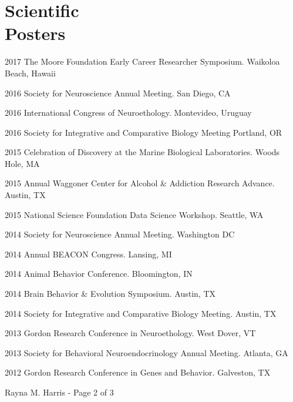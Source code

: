 \documentclass[margin,line]{resume}
\begin{document}
\begin{resume}
\begin{description}
\end{description}


\section{\mysidestyle Scientific\\Posters}

\begin{list1}

\item[]2017	The Moore Foundation Early Career Researcher Symposium. Waikoloa Beach, Hawaii
\item[]2016	Society for Neuroscience Annual Meeting. San Diego, CA
\item[]2016	International Congress of Neuroethology. Montevideo, Uruguay
\item[]2016 Society for Integrative and Comparative Biology Meeting Portland, OR
\item[]2015	Celebration of Discovery at the Marine Biological Laboratories. Woods Hole, MA
\item[]2015	Annual Waggoner Center for Alcohol \& Addiction Research Advance. Austin, TX
\item[]2015	National Science Foundation Data Science Workshop. Seattle, WA
\item[]2014	Society for Neuroscience Annual Meeting. Washington DC
\item[]2014	Annual BEACON Congress. Lansing, MI
\item[]2014	Animal Behavior Conference. Bloomington, IN
\item[]2014	Brain Behavior \& Evolution Symposium. Austin, TX
\item[]2014	Society for Integrative and Comparative Biology Meeting. Austin, TX
\item[]2013	Gordon Research Conference in Neuroethology. West Dover, VT
\item[]2013	Society for Behavioral Neuroendocrinology Annual Meeting. Atlanta, GA
\item[]2012	Gordon Research Conference in Genes and Behavior. Galveston, TX

\end{list1}


\vspace{0.3 cm}
{\centerline {Rayna M. Harris - Page 2 of 3}}
\newpage



\end{resume}
\end{document}
